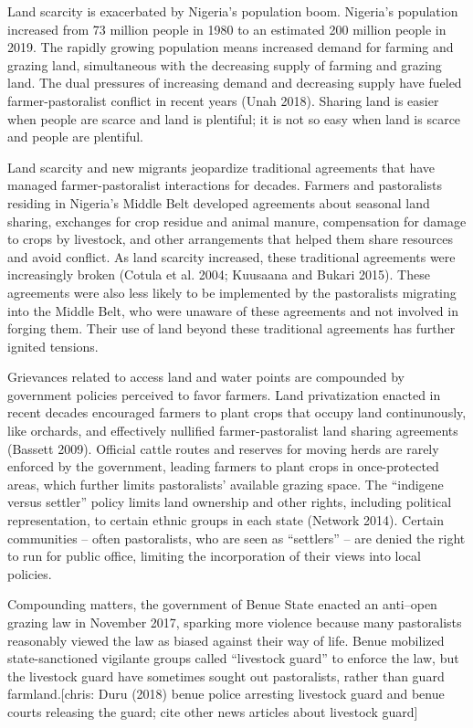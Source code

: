 \documentclass[11pt]{article}
\begin{document}
Land scarcity is exacerbated by Nigeria's population boom. Nigeria's
population increased from 73 million people in 1980 to an estimated 200
million people in 2019. The rapidly growing population means increased
demand for farming and grazing land, simultaneous with the decreasing
supply of farming and grazing land. The dual pressures of increasing
demand and decreasing supply have fueled farmer-pastoralist conflict in
recent years (Unah 2018). Sharing land is easier when people are scarce
and land is plentiful; it is not so easy when land is scarce and people
are plentiful.

Land scarcity and new migrants jeopardize traditional agreements that
have managed farmer-pastoralist interactions for decades. Farmers and
pastoralists residing in Nigeria's Middle Belt developed agreements
about seasonal land sharing, exchanges for crop residue and animal
manure, compensation for damage to crops by livestock, and other
arrangements that helped them share resources and avoid conflict. As
land scarcity increased, these traditional agreements were increasingly
broken (Cotula et al. 2004; Kuusaana and Bukari 2015). These agreements
were also less likely to be implemented by the pastoralists migrating
into the Middle Belt, who were unaware of these agreements and not
involved in forging them. Their use of land beyond these traditional
agreements has further ignited tensions.

Grievances related to access land and water points are compounded by
government policies perceived to favor farmers. Land privatization
enacted in recent decades encouraged farmers to plant crops that occupy
land continunously, like orchards, and effectively nullified
farmer-pastoralist land sharing agreements (Bassett 2009). Official
cattle routes and reserves for moving herds are rarely enforced by the
government, leading farmers to plant crops in once-protected areas,
which further limits pastoralists' available grazing space. The
``indigene versus settler'' policy limits land ownership and other
rights, including political representation, to certain ethnic groups in
each state (Network 2014). Certain communities -- often pastoralists,
who are seen as ``settlers'' -- are denied the right to run for public
office, limiting the incorporation of their views into local policies.

Compounding matters, the government of Benue State enacted an anti--open
grazing law in November 2017, sparking more violence because many
pastoralists reasonably viewed the law as biased against their way of
life. Benue mobilized state-sanctioned vigilante groups called
``livestock guard'' to enforce the law, but the livestock guard have
sometimes sought out pastoralists, rather than guard farmland.{[}chris:
Duru (2018) benue police arresting livestock guard and benue courts
releasing the guard; cite other news articles about livestock guard{]}
\end{document}
